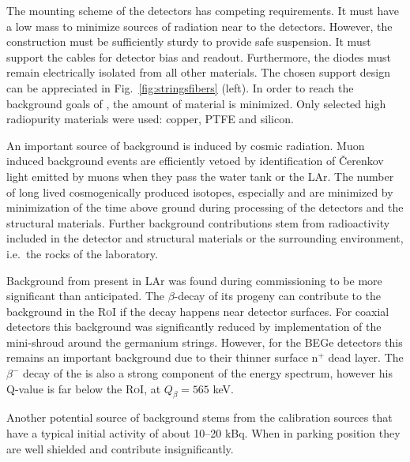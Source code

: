 The mounting scheme of the detectors has competing requirements. It must have a low mass to minimize sources of radiation near to the detectors. However, the construction must be sufficiently sturdy to provide safe suspension. It must support the cables for detector bias and readout. Furthermore, the diodes must remain electrically isolated from all other materials. The chosen support design can be appreciated in Fig.~\ref{fig:stringsfibers} (left). In order to reach the background goals of {\gerda}, the amount of material is minimized. Only selected high radiopurity materials were used: copper, PTFE and silicon.

 An important source of background is induced by cosmic radiation. Muon induced background events are efficiently vetoed by identification of Čerenkov light emitted by muons when they pass the water tank or the LAr. The number of long lived cosmogenically produced isotopes, especially  and  are minimized by minimization of the time above ground during processing of the detectors and the structural materials. Further background contributions stem from radioactivity included in the detector and structural materials or the surrounding environment, i.e.~the rocks of the laboratory.

Background from  present in LAr was found during {\gerda} commissioning to be more significant than anticipated. The $\beta$-decay of its progeny  can contribute to the background in the \textsc{RoI} if the decay happens near detector surfaces. For coaxial detectors this background was significantly reduced by implementation of the mini-shroud around the germanium strings. However, for the BEGe detectors this remains an important background due to their thinner surface n$^+$ dead layer. The $\beta^-$ decay of the  is also a strong component of the energy spectrum, however his Q-value is far below the \textsc{RoI}, at $Q_\beta=565$ keV.

Another potential source of background stems from the calibration sources that have a typical initial activity of about 10–20 kBq. When in parking position they are well shielded and contribute insignificantly.

